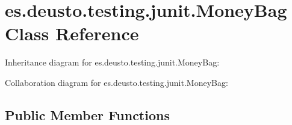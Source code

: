 \hypertarget{classes_1_1deusto_1_1testing_1_1junit_1_1_money_bag}{}\section{es.\+deusto.\+testing.\+junit.\+Money\+Bag Class Reference}
\label{classes_1_1deusto_1_1testing_1_1junit_1_1_money_bag}


Inheritance diagram for es.\+deusto.\+testing.\+junit.\+Money\+Bag\+:


Collaboration diagram for es.\+deusto.\+testing.\+junit.\+Money\+Bag\+:
\subsection*{Public Member Functions}
